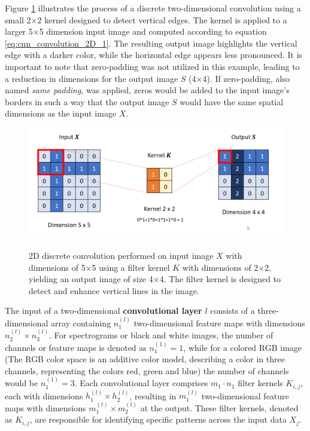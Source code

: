 Figure \ref{fig:frmwk_cnn_convolution_example} illustrates the process of a discrete two-dimensional convolution using a small 2×2 kernel designed to detect vertical edges. The kernel is applied to a larger 5×5 dimension input image and computed according to equation \ref{eq:cnn_convolution_2D_1}. The resulting output image highlights the vertical edge with a darker color, while the horizontal edge appears less pronounced. It is important to note that zero-padding was not utilized in this example, leading to a reduction in dimensions for the output image $S$ (4×4). If zero-padding, also named \textit{same padding}, was applied, zeros would be added to the input image's borders in such a way that the output image $S$ would have the same spatial dimensions as the input image $X$.

\begin{figure}[htbp]
    \raggedright
        \caption{2D discrete convolution performed on input image $X$ with dimensions of 5×5 using a filter kernel $K$ with dimensions of 2×2, yielding an output image of size 4×4. The filter kernel is designed to detect and enhance vertical lines in the image.}
        \includegraphics[width=.8\textwidth]{resources/images/030-theoretical_framework/Framework_cnn_example.png}
        \label{fig:frmwk_cnn_convolution_example}
\end{figure}

The input of a two-dimensional \textbf{convolutional layer} $l$ consists of a three-dimensional array containing $n_1^{(l)}$ two-dimensional feature maps with dimensions $n_2^{(l)} \times n_3^{(l)}$. For spectrograms or black and white images, the number of channels or feature maps is denoted as $n_1^{(1)}=1$, while for a colored RGB image (The RGB color space is an additive color model, describing a color in three channels, representing the colors red, green and blue) the number of channels would be $n_1^{(1)}=3$. Each convolutional layer comprises $m_1 \cdot n_1$ filter kernels $K_{i,j}$, each with dimensions $h_1^{(l)} \times h_2^{(l)}$, resulting in $m_1^{(l)}$ two-dimensional feature maps with dimensions $m_1^{(l)} \times m_2^{(l)}$ at the output. These filter kernels, denoted as $K_{i,j}$, are responsible for identifying specific patterns across the input data $X_j$. 

